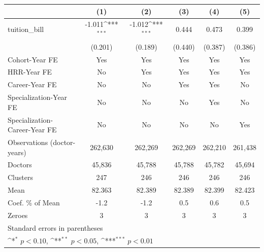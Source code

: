 {
\def\sym#1{\ifmmode^{#1}\else\(^{#1}\)\fi}
\begin{tabular}{l*{5}{c}}
\hline\hline
                    &\multicolumn{1}{c}{(1)}         &\multicolumn{1}{c}{(2)}         &\multicolumn{1}{c}{(3)}         &\multicolumn{1}{c}{(4)}         &\multicolumn{1}{c}{(5)}         \\
\hline
tuition\_bill        &      -1.011\sym{***}&      -1.012\sym{***}&       0.444         &       0.473         &       0.399         \\
                    &     (0.201)         &     (0.189)         &     (0.440)         &     (0.387)         &     (0.386)         \\
[1em]
Cohort-Year FE      &         Yes         &         Yes         &         Yes         &         Yes         &         Yes         \\
[1em]
HRR-Year FE         &          No         &         Yes         &         Yes         &         Yes         &         Yes         \\
[1em]
Career-Year FE      &          No         &          No         &         Yes         &         Yes         &          No         \\
[1em]
Specialization-Year FE&          No         &          No         &          No         &         Yes         &          No         \\
[1em]
Specialization-Career-Year FE&          No         &          No         &          No         &          No         &         Yes         \\
\hline
Observations (doctor-years)&     262,630         &     262,269         &     262,269         &     262,210         &     261,438         \\
Doctors             &      45,836         &      45,788         &      45,788         &      45,782         &      45,694         \\
Clusters            &         247         &         246         &         246         &         246         &         246         \\
Mean                &      82.363         &      82.389         &      82.389         &      82.399         &      82.423         \\
Coef. \% of Mean    &        -1.2         &        -1.2         &         0.5         &         0.6         &         0.5         \\
Zeroes              &           3         &           3         &           3         &           3         &           3         \\
\hline\hline
\multicolumn{6}{l}{\footnotesize Standard errors in parentheses}\\
\multicolumn{6}{l}{\footnotesize \sym{*} \(p<0.10\), \sym{**} \(p<0.05\), \sym{***} \(p<0.01\)}\\
\end{tabular}
}
